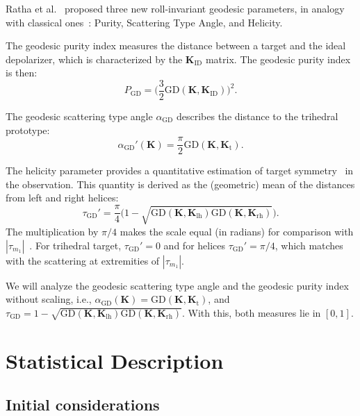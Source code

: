 \documentclass[journal]{IEEEtran}
\begin{document}
	Ratha et al.~\cite{APolSARScatteringPowerFactorizationFrameworkandNovelRollInvariantParametersBasedUnsupervisedClassificationSchemeUsingaGeodesicDistanceinpress} proposed three new roll-invariant geodesic parameters, in analogy with classical ones~\cite{gil85,CloudePottier:97,Touzi:TGARS:2007}: Purity, Scattering Type Angle, and Helicity.
	
	The geodesic purity index measures the distance between a target and the ideal depolarizer, which is characterized by the $\bm{K}_{\text{ID}}$ matrix.
	The geodesic purity index is then:
	\begin{equation}
		P_{\text{GD}} = \Big(\frac{3}{2}\text{GD}(\bm{K}, \bm{K}_{\text{ID}})\Big)^2.
	\end{equation}
	
	The geodesic scattering type angle $\alpha_{\text{GD}}$ describes 
	the distance to the trihedral prototype:
	\begin{equation}
		\alpha_{\text{GD}}'(\bm{K}) = \frac{\pi}{2}  \text{GD}(\bm{K},\bm{K}_{\text{t}}).
	\end{equation}
	
	The helicity parameter provides a quantitative estimation of target symmetry~\cite{Touzi:TGARS:2007} in the observation. 
	This quantity is derived as the (geometric) mean of the distances from left and right helices:
	\begin{equation}
		\tau_{\text{GD}}' = \frac\pi4 \big(1 - \sqrt{\text{GD}(\bm{K},\bm{K}_{\text{lh}})\text{GD}(\bm{K},\bm{K}_{\text{rh}})}\big).
	\end{equation}
	The multiplication by $\pi/4$ makes the scale equal (in radians) for comparison with $|\tau_{m_1}|$~\cite{Touzi:TGARS:2007}. 
	For trihedral target, $\tau_{\text{GD}}' = 0$ and for helices $\tau_{\text{GD}}' = \pi/4$, which matches with the scattering at extremities of $|\tau_{m_1}|$.
	
	We will analyze the geodesic scattering type angle and the geodesic purity index without scaling, i.e., $\alpha_{\text{GD}}(\bm{K}) = \text{GD}(\bm{K},\bm{K}_{\text{t}})$, and 
	$\tau_{\text{GD}} = 1 - \sqrt{\text{GD}(\bm{K},\bm{K}_{\text{lh}})\text{GD}(\bm{K},\bm{K}_{\text{rh}})}$.
	With this, both measures lie in $[0,1]$.
	
	\section{Statistical Description}
	
	\subsection{Initial considerations}
	
\end{document}
